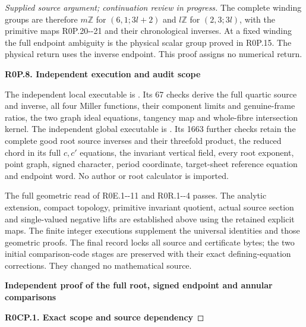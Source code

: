 \begin{proof}[Supplied source argument; continuation review in progress]
The complete winding groups are therefore
\(m\mathbb Z\) for \((6,1;3l+2)\) and
\(l\mathbb Z\) for \((2,3;3l)\), with the
primitive maps R0P.20-\/-21 and their chronological
inverses. At a fixed winding the full endpoint
ambiguity is the physical scalar group proved in
R0P.15. The physical return uses the inverse
endpoint. This proof assigns no numerical return.

\par

\medskip\noindent\textbf{R0P.8. Independent execution and audit scope}

\par\nobreak

The independent local executable is
.
Its 67 checks derive the full quartic source and
inverse, all four Miller functions, their component
limits and genuine-frame ratios, the two graph
ideal equations, tangency map and whole-fibre
intersection kernel. The independent global
executable is
.
Its 1663 further checks retain the complete good
root source inverses and their threefold product,
the reduced chord in its full \(c,c'\) equations,
the invariant vertical field, every root exponent,
point graph, signed character, period coordinate,
target-sheet reference equation and endpoint word.
No author or root calculator is imported.

The full geometric read of R0E.1-\/-11 and R0R.1-\/-4
passes. The analytic extension, compact topology,
primitive invariant quotient, actual source section
and single-valued negative lifts are established
above using the retained explicit maps. The finite
integer executions supplement the universal
identities and those geometric proofs. The final
record locks all source and certificate bytes;
the two initial comparison-code stages are
preserved with their exact defining-equation
corrections. They changed no mathematical source.


\par\bigskip\noindent\textbf{Independent proof of the full root, signed endpoint and annular comparisons}\par\nobreak

\par

\medskip\noindent\textbf{R0CP.1. Exact scope and source dependency}


\end{proof}
